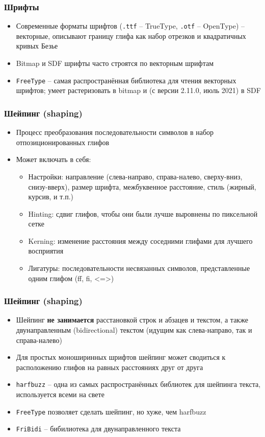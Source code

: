 \documentclass{beamer}
\begin{document}
\begin{frame}[fragile]
\frametitle{Шрифты}
\begin{itemize}
\item Современные форматы шрифтов (\verb|.ttf| -- TrueType, \verb|.otf| -- OpenType) -- векторные, описывают границу глифа как набор отрезков и квадратичных кривых Безье
\pause
\item Bitmap и SDF шрифты часто строятся по векторным шрифтам
\pause
\item \verb|FreeType| -- самая распространённая библиотека для чтения векторных шрифтов; умеет растеризовать в bitmap и (с версии 2.11.0, июль 2021) в SDF
\end{itemize}
\end{frame}

\begin{frame}[fragile]
\frametitle{Шейпинг (shaping)}
\begin{itemize}
\item Процесс преобразования последовательности символов в набор отпозиционированных глифов
\pause
\item Может включать в себя:
\pause
\begin{itemize}
\item Настройки: направление (слева-направо, справа-налево, сверху-вниз, снизу-вверх), размер шрифта, межбуквенное расстояние, стиль (жирный, курсив, и т.п.)
\pause
\item Hinting: сдвиг глифов, чтобы они были лучше выровнены по пиксельной сетке
\pause
\item Kerning: изменение расстояния между соседними глифами для лучшего восприятия
\pause
\item Лигатуры: последовательности несвязанных символов, представленные одним глифом (ff, fi, <=>)
\end{itemize}
\end{itemize}
\end{frame}

\begin{frame}[fragile]
\frametitle{Шейпинг (shaping)}
\begin{itemize}
\item Шейпинг \alert{\textbf{не занимается}} расстановкой строк и абзацев и текстом, а также двунаправленным (bidirectional) текстом (идущим как слева-направо, так и справа-налево)
\pause
\item Для простых моноширинных шрифтов шейпинг может сводиться к расположению глифов на равных расстояниях друг от друга
\pause
\item \verb|harfbuzz| -- одна из самых распространённых библиотек для шейпинга текста, используется всеми на свете
\pause
\item \verb|FreeType| позволяет сделать шейпинг, но хуже, чем harfbuzz
\pause
\item \verb|FriBidi| -- бибилиотека для двунаправленного текста
\end{itemize}
\end{frame}
\end{document}
